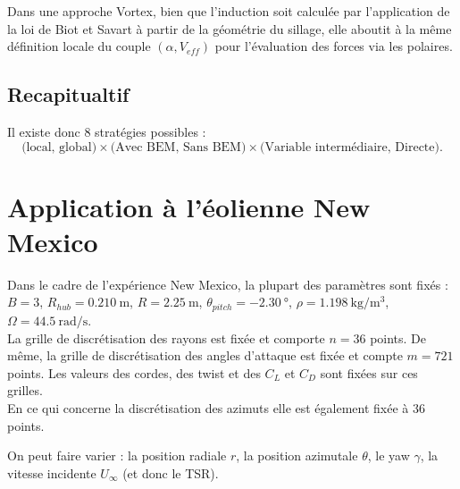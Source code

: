 \documentclass[11pt, a4paper]{article}
\begin{document}
Dans une approche Vortex, bien que l'induction soit calculée par l'application de la loi de Biot et Savart à partir de la géométrie du sillage, elle aboutit à la même définition locale du couple $(\alpha, V_{eff})$ pour l'évaluation des forces via les polaires.

\subsection{Recapitualtif}

Il existe donc 8 stratégies possibles :
$$ \text{(local, global)} \times \text{(Avec BEM, Sans BEM)} \times \text{(Variable intermédiaire, Directe)}.$$

\section{Application à l'éolienne New Mexico}

Dans le cadre de l'expérience New Mexico, la plupart des paramètres sont fixés : 
$B=3$, $R_{hub}=\SI{0.210}{\meter}$, $R=\SI{2.25}{\meter}$, $\theta_{pitch}=\SI{-2.30}{\degree}$, $\rho=\SI{1.198}{\kilogram\per\meter\cubed} $, $\Omega=\SI{44.5}{\radian\per\second}$. \\

La grille de discrétisation des rayons est fixée et comporte $n=36$ points. De même, la grille de discrétisation des angles d'attaque est fixée et compte $m=721$ points. Les valeurs des cordes, des twist et des $C_L$ et $C_D$ sont fixées sur ces grilles. \\

En ce qui concerne la discrétisation des azimuts elle est également fixée à $36$ points.

On peut faire varier : la position radiale $r$, la position azimutale $\theta$, le yaw $\gamma$, la vitesse incidente $U_\infty$ (et donc le TSR).
\end{document}
